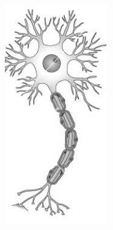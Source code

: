 \documentclass[aspectratio=169]{beamer}
\begin{document}
\begin{frame}
\begin{figure}[ht]
\begin{minipage}[b]{0.23\linewidth}
            \includegraphics[width=0.4\textwidth]{images/InactiveNeuron.jpg}
        \end{minipage}
        \begin{minipage}[b]{0.23\linewidth}
            

\end{minipage}
\end{figure}
\end{frame}
\end{document}

